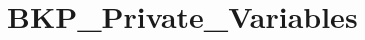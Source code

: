 \hypertarget{group___b_k_p___private___variables}{\section{B\-K\-P\-\_\-\-Private\-\_\-\-Variables}
\label{group___b_k_p___private___variables}
}
